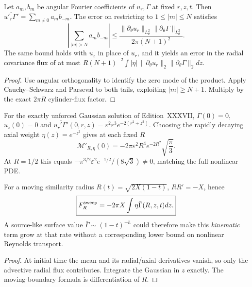 \begin{proposition}
\label{prop:xxxix-leakage}
Let $a_m,b_m$ be angular Fourier coefficients of
$u_r,\Gamma$ at fixed $r,z,t$.
Then
$\overline{u'_r\Gamma'}=\sum_{m\ne0}a_m b_{-m}$.
The error on restricting to $1\le|m|\le N$ satisfies
\begin{equation}\label{eq:xxxix-spectral-tail}
\boxed{
\left|\sum_{|m|>N}a_m b_{-m}\right|
\le\frac{\|\partial_\theta u_r\|_{L^2_\theta}
\|\partial_\theta\Gamma\|_{L^2_\theta}}
{2\pi(N+1)^2}.
}
\end{equation}
The same bound holds with $u_z$ in place of $u_r$,
and it yields an error in the radial covariance flux
of at most
$R(N+1)^{-2}\int|\eta|\,
\|\partial_\theta u_r\|_2\|\partial_\theta\Gamma\|_2dz$.
\end{proposition}
\begin{proof}
Use angular orthogonality to identify the zero mode
of the product. Apply Cauchy--Schwarz and Parseval
to both tails, exploiting $|m|\ge N+1$.
Multiply by the exact $2\pi R$ cylinder-flux factor.
\end{proof}

\begin{proposition}
\label{prop:xxxix-bench}
For the exactly unforced Gaussian solution of Edition~XXXVII,
$\overline{\Gamma}(0)=0$, $u_z(0)=0$ and
$\overline{u_r'\Gamma'}(0,r,z)
=\varepsilon^2r^3e^{-2(r^2+z^2)}$.
Choosing the rapidly decaying axial weight
$\eta(z)=e^{-z^2}$ gives at each fixed $R$
\begin{equation}\label{eq:xxxix-gaussian}
\boxed{
\mathcal M'_{R,\eta}(0)=
-2\pi\varepsilon^2R^4e^{-2R^2}\sqrt{\frac\pi3}.
}
\end{equation}
At $R=1/2$ this equals
$-\pi^{3/2}\varepsilon^2e^{-1/2}/(8\sqrt3)\ne0$,
matching the full nonlinear PDE.

For a moving similarity radius
$R(t)=\sqrt{2X(1-t)}$, $RR'=-X$, hence
\begin{equation}\label{eq:xxxix-sweep}
\boxed{F_R^{\rm sweep}
=-2\pi X\int\eta\bar\Gamma(R,z,t)dz.}
\end{equation}
A source-like surface value $\bar\Gamma\sim(1-t)^{-h}$
could therefore make this \emph{kinematic} term
grow at that rate without a corresponding lower bound
on nonlinear Reynolds transport.
\end{proposition}
\begin{proof}
At initial time the mean and its radial/axial
derivatives vanish, so only the advective radial flux
contributes. Integrate the Gaussian in $z$ exactly.
The moving-boundary formula is differentiation of $R$.
\end{proof}


